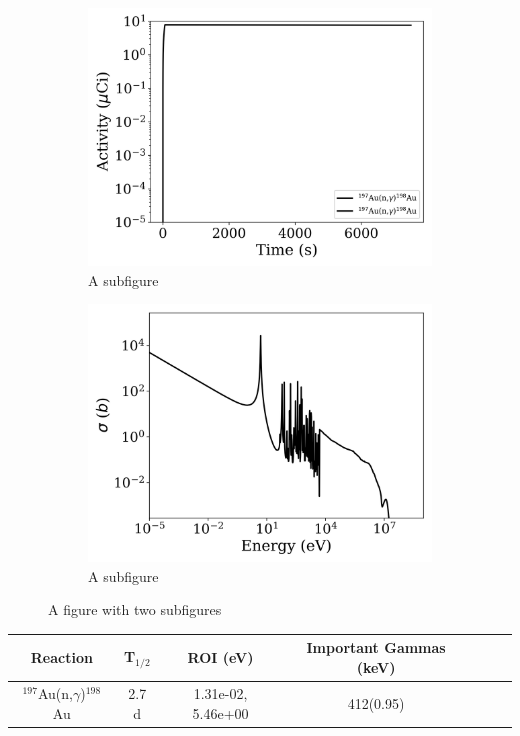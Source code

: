 \begin{figure}[h]
\centering
\begin{subfigure}{.5\textwidth}
  \centering
     \includegraphics[width=.8\textwidth]{plot/Au-197(n,gamma)Au-198_library1} 

  \caption{A subfigure}
  \label{fig:sub1}
\end{subfigure}%
\begin{subfigure}{.5\textwidth}
  \centering
     \includegraphics[width=.8\textwidth]{plot/Au-197(n,gamma)Au-198} 

  \caption{A subfigure}
  \label{fig:sub2}
\end{subfigure}
\caption{A figure with two subfigures}
\label{fig:test}
\end{figure}

\begin{table}[h]
\centering
\begin{tabular}{ |c|c|c|c|c|c|c| }
 \hline
 Reaction & T$_{1/2}$ & ROI (eV) & Important Gammas (keV) \\
 \hline 
 $^{197}$Au(n,$\gamma$)$^{198}$Au &  2.7 d & 1.31e-02, 5.46e+00 & 412(0.95) \\ 
\hline
\end{tabular}
\end{table}
